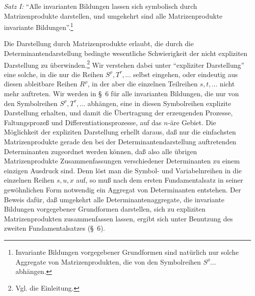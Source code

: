 \documentclass[11pt]{article}
\begin{document}
\emph{Satz I:} ``Alle invarianten Bildungen lassen sich symbolisch durch Matrizenprodukte darstellen, und umgekehrt sind alle Matrizenprodukte invariante Bildungen''.\footnote{Invariante Bildungen vorgegebener Grundformen sind natürlich nur solche Aggregate von Matrizenprodukten, die von den Symbolreihen $S^\rho\ldots$ abhängen.}

Die Darstellung durch Matrizenprodukte erlaubt, die durch die Determinantendarstellung bedingte wesentliche Schwierigkeit der nicht expliziten Darstellung zu überwinden.\footnote{Vgl. die Einleitung.} Wir verstehen dabei unter ``expliziter Darstellung'' eine solche, in die nur die Reihen $S^\rho,T^\tau,\ldots$ selbst eingehen, oder eindeutig aus diesen ableitbare Reihen $R^\rho$, in der aber die einzelnen Teilreihen $s,t,\ldots$ nicht mehr auftreten. Wir werden in \S\ 6 für alle invarianten Bildungen, die nur von den Symbolreihen $S^\rho,T^\tau,\ldots$ abhängen, eine in diesen Symbolreihen explizite Darstellung erhalten, und damit die Übertragung der erzeugenden Prozesse, Faltungsprozeß und Differentiationsprozesse, auf das $n$-äre Gebiet. Die Möglichkeit der expliziten Darstellung erhellt daraus, daß nur die einfachsten Matrizenprodukte gerade den bei der Determinantendarstellung auftretenden Determinanten zugeordnet werden können, daß also alle übrigen Matrizenprodukte Zusammenfassungen verschiedener Determinanten zu einem einzigen Ausdruck sind. Denn löst man die Symbol- und Variabelnreihen in die einzelnen Reihen $s,u,x$ auf, so muß nach dem ersten Fundamentalsatz in seiner gewöhnlichen Form notwendig ein Aggregat von Determinanten entstehen. Der Beweis dafür, daß umgekehrt alle Determinantenaggregate, die invariante Bildungen vorgegebener Grundformen darstellen, sich zu expliziten Matrizenprodukten zusammenfassen lassen, ergibt sich unter Benutzung des zweiten Fundamentalsatzes (\S\ 6).
\end{document}
